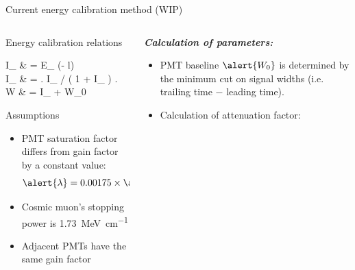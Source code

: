 \documentclass{ikpKoeln}
\begin{document}
\begin{frame}[t]{Current energy calibration method (WIP)}
	\vspace*{-0.5em}
	\begin{columns}[c]
		\begin{column}{0.45 \textwidth}
			\vspace{-1.5em}
			\begin{alertblock}{Energy calibration relations}
				\setlength{\abovedisplayskip}{0pt}
				\setlength{\belowdisplayskip}{0pt}
				\setlength{\abovedisplayshortskip}{0pt}
				\setlength{\belowdisplayshortskip}{0pt}
				\begin{flalign}
					I_ & = E_ \cdot \exp(-\alert{\alpha} \cdot l)                                           \\
					I_ & = \left. I_ \middle/ \left( 1 + \alert{\lambda} \cdot I_ \right) \right. \\
					W            & = \alert{} \cdot I_ + \alert{W_0}
				\end{flalign}
			\end{alertblock}
			\vspace{-0.5em}
			\begin{exampleblock}{Assumptions}
				\begin{itemize}
					\setlength\itemsep{0em}
					\item PMT saturation factor differs from gain factor by a constant value: \vspace{-1em}$$\alert{\lambda} = 0.00175 \times \alert{\mathcal{G}}$$
					\item \vspace{-1em}Cosmic muon's stopping power is \qty{1.73}{\mega\electronvolt\per\centi\metre}
					\item Adjacent PMTs have the same gain factor
				\end{itemize}
			\end{exampleblock}
		\end{column}
		\begin{column}{0.45 \textwidth}
			\textit{\textbf{Calculation of parameters:}}
			{\small
				\begin{itemize}
					\setlength\itemsep{0em}
					\item PMT baseline $\alert{W_0}$ is determined by the minimum cut on signal widths (i.e. trailing time $-$ leading time).
					\item Calculation of attenuation factor:

\end{itemize}}
\end{column}
\end{columns}
\end{frame}
\end{document}
